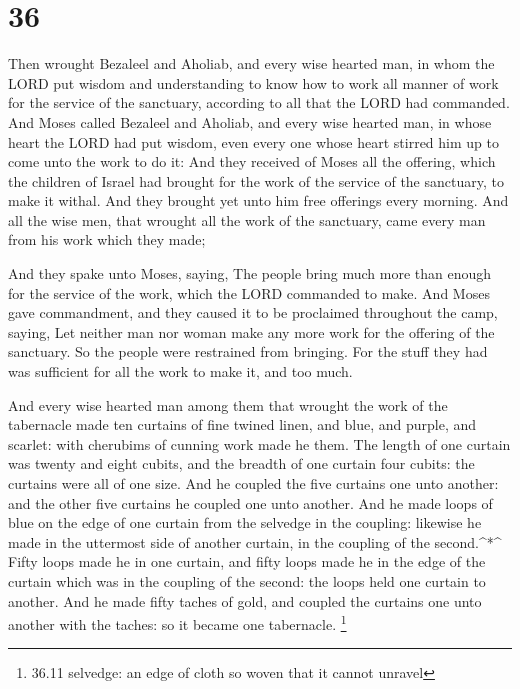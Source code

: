\hypertarget{section-35}{%
\section{36}\label{section-35}}

 Then wrought Bezaleel and Aholiab, and every wise hearted
man, in whom the LORD put wisdom and understanding to know how to work
all manner of work for the service of the sanctuary, according to all
that the LORD had commanded.  And Moses called Bezaleel and
Aholiab, and every wise hearted man, in whose heart the LORD had put
wisdom, even every one whose heart stirred him up to come unto the work
to do it:  And they received of Moses all the offering,
which the children of Israel had brought for the work of the service of
the sanctuary, to make it withal. And they brought yet unto him free
offerings every morning.  And all the wise men, that wrought
all the work of the sanctuary, came every man from his work which they
made;

 And they spake unto Moses, saying, The people bring much
more than enough for the service of the work, which the LORD commanded
to make.  And Moses gave commandment, and they caused it to
be proclaimed throughout the camp, saying, Let neither man nor woman
make any more work for the offering of the sanctuary. So the people were
restrained from bringing.  For the stuff they had was
sufficient for all the work to make it, and too much.

 And every wise hearted man among them that wrought the work
of the tabernacle made ten curtains of fine twined linen, and blue, and
purple, and scarlet: with cherubims of cunning work made he them.
 The length of one curtain was twenty and eight cubits, and
the breadth of one curtain four cubits: the curtains were all of one
size.  And he coupled the five curtains one unto another:
and the other five curtains he coupled one unto another. 
And he made loops of blue on the edge of one curtain from the selvedge
in the coupling: likewise he made in the uttermost side of another
curtain, in the coupling of the second.\^{}*\^{}  Fifty
loops made he in one curtain, and fifty loops made he in the edge of the
curtain which was in the coupling of the second: the loops held one
curtain to another.  And he made fifty taches of gold, and
coupled the curtains one unto another with the taches: so it became one
tabernacle. \footnote{36.11 selvedge: an edge of cloth so woven that it
  cannot unravel}

